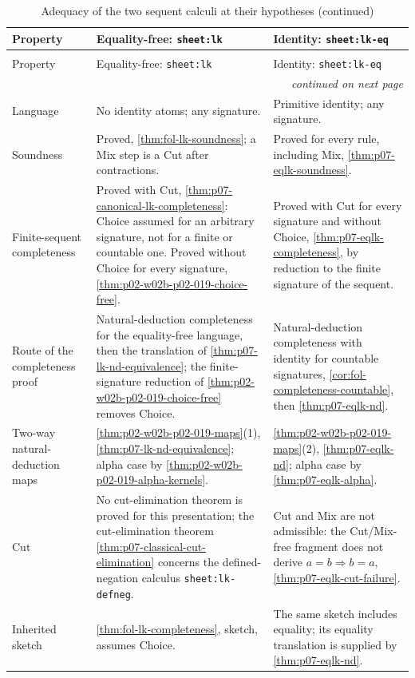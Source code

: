 \begingroup\small
\begin{longtable}{@{}p{}p{}p{}@{}}
\caption{Adequacy of the two sequent calculi at their hypotheses.}
\label{tab:p02-w02b-p02-019-lk-adequacy}\\
\toprule
Property & Equality-free: \texttt{sheet:lk} & Identity: \texttt{sheet:lk-eq} \\
\midrule
\endfirsthead
\caption[]{Adequacy of the two sequent calculi at their hypotheses (continued)}\\
\toprule
Property & Equality-free: \texttt{sheet:lk} & Identity: \texttt{sheet:lk-eq} \\
\midrule
\endhead
\midrule\multicolumn{3}{r}{\emph{continued on next page}}\\
\endfoot
\endlastfoot
Language & No identity atoms; any signature. & Primitive identity; any
signature. \\
Soundness & Proved, \cref{thm:fol-lk-soundness}; a Mix step is a
Cut after contractions. & Proved for every rule, including Mix,
\cref{thm:p07-eqlk-soundness}. \\
Finite-sequent completeness & Proved with Cut,
\cref{thm:p07-canonical-lk-completeness}: Choice assumed for an arbitrary
signature, not for a finite or countable one.  Proved without Choice for
every signature, \cref{thm:p02-w02b-p02-019-choice-free}. & Proved with Cut
for every signature and without Choice,
\cref{thm:p07-eqlk-completeness}, by reduction to the finite signature of the
sequent. \\
Route of the completeness proof & Natural-deduction completeness for the
equality-free language, then the translation of
\cref{thm:p07-lk-nd-equivalence}; the finite-signature reduction of
\cref{thm:p02-w02b-p02-019-choice-free} removes Choice. & Natural-deduction completeness
with identity for countable signatures,
\cref{cor:fol-completeness-countable}, then
\cref{thm:p07-eqlk-nd}. \\
Two-way natural-deduction maps & \cref{thm:p02-w02b-p02-019-maps}(1),
\cref{thm:p07-lk-nd-equivalence}; alpha case by
\cref{thm:p02-w02b-p02-019-alpha-kernels}. &
\cref{thm:p02-w02b-p02-019-maps}(2), \cref{thm:p07-eqlk-nd}; alpha case by
\cref{thm:p07-eqlk-alpha}. \\
Cut & No cut-elimination theorem is proved for this presentation; the
cut-elimination theorem \cref{thm:p07-classical-cut-elimination} concerns the
defined-negation calculus \texttt{sheet:lk-defneg}. & Cut and Mix are not
admissible: the Cut/Mix-free fragment does not derive \(a=b\Rightarrow b=a\),
\cref{thm:p07-eqlk-cut-failure}. \\
Inherited sketch & \cref{thm:fol-lk-completeness}, sketch, assumes Choice. &
The same sketch includes equality; its equality translation is supplied by
\cref{thm:p07-eqlk-nd}. \\
\bottomrule
\end{longtable}
\endgroup

